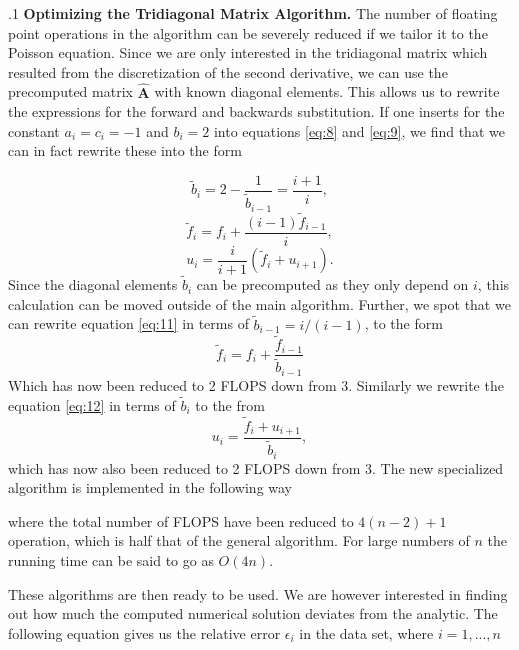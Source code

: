 \documentclass[a4paper,10pt]{article}
\begin{document}
.1 \textbf{Optimizing the Tridiagonal Matrix Algorithm.}
The number of floating point operations in the algorithm can be severely reduced if we tailor it to the Poisson equation. Since we are only interested in the tridiagonal matrix which resulted from the discretization of the second derivative, we can use the precomputed matrix $\mathbf{\hat{A}}$ with known diagonal elements. This allows us to rewrite the expressions for the forward and backwards substitution. If one inserts for the constant $a_i =  c_i = -1$ and $b_i = 2$ into equations \eqref{eq:8} and \eqref{eq:9}, we find that we can in fact rewrite these into the form

\begin{equation}\label{eq:10}
\tilde{b}_i = 2 - \frac{1}{\tilde{b}_{i-1}} = \frac{i+1}{i},
\end{equation}
\begin{equation}\label{eq:11}
\tilde{f}_i = f_i + \frac{(i-1)\tilde{f}_{i-1}}{i},
\end{equation}
\begin{equation}\label{eq:12}
u_{i} = \frac{i}{i+1}(\tilde{f}_{i} +u_{i+1}).
\end{equation}
Since the diagonal elements $\tilde{b}_i$ can be precomputed as they only depend on $i$, this calculation can be moved outside of the main algorithm. Further, we spot that we can rewrite equation \eqref{eq:11} in terms of $\tilde{b}_{i-1} = i/(i-1) $, to the form
\begin{equation}\label{eq:13}
\tilde{f}_i = f_i + \frac{\tilde{f}_{i-1}}{\tilde{b}_{i-1}}
\end{equation}
Which has now been reduced to 2 FLOPS down from 3. Similarly we rewrite the equation \eqref{eq:12} in terms of $\tilde{b}_i$ to the from
\begin{equation}\label{eq:14}
u_i = \frac{\tilde{f}_i + u_{i+1}}{\tilde{b}_i},
\end{equation}
which has now also been reduced to 2 FLOPS down from 3. 
The new specialized algorithm is implemented in the
 following way

where the total number of FLOPS have been reduced to $4(n-2) + 1$ operation, which is half that of the general algorithm. For large numbers of $n$ the running time can be said to go as $O(4n)$.

These algorithms are then ready to be used. We are however  interested in finding out how much the computed numerical solution deviates from the analytic. The following equation gives us the relative error $\epsilon_i$ in the data set, where $i = 1, ...,n$
\end{document}

